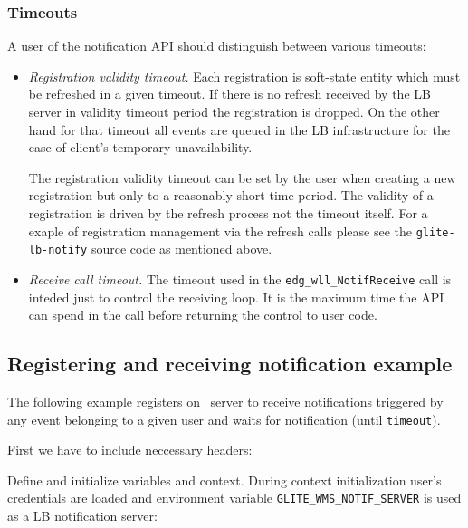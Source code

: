 \subsubsection{Timeouts}
A user of the notification API should distinguish between various timeouts:
\begin{itemize}
\item \emph{Registration validity timeout.} Each registration is
soft-state entity which must be refreshed in a given timeout. If there
is no refresh received by the LB server in validity timeout period the
registration is dropped. On the other hand for that timeout all events
are queued in the LB infrastructure for the case of client's temporary
unavailability.

The registration validity timeout can be set by the user when creating
a new registration but only to a reasonably short time period. The
validity of a registration is driven by the refresh process not the
timeout itself. For a exaple of registration management via the
refresh calls please see the \verb'glite-lb-notify' source code as
mentioned above.

\item \emph{Receive call timeout.} The timeout used in the
\verb'edg_wll_NotifReceive' call is inteded just to control the
receiving loop. It is the maximum time the API can spend in the call
before returning the control to user code.

\end{itemize}

\subsection{Registering and receiving notification example}

The following example registers on \LB\ server to receive
notifications triggered by any event belonging to a
given user and waits for notification (until \verb'timeout').


First we have to include neccessary headers:


Define and initialize variables and context. During context
initialization user's credentials are loaded and environment variable
\verb'GLITE_WMS_NOTIF_SERVER' is used as a LB notification server:
 


